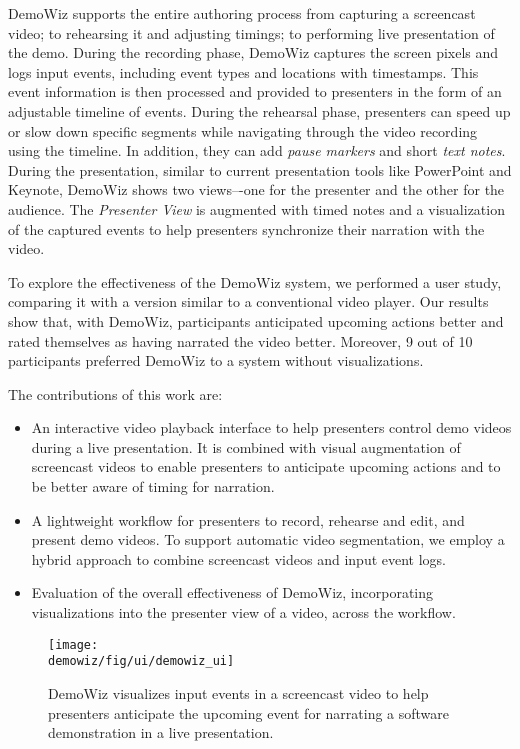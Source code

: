 DemoWiz supports the entire authoring process from capturing a screencast video; to rehearsing it and adjusting timings; to performing live presentation of the demo. During the recording phase, DemoWiz captures the screen pixels and logs input events, including event types and locations with timestamps. This event information is then processed and provided to presenters in the form of an adjustable timeline of events. During the rehearsal phase, presenters can speed up or slow down specific segments while navigating through the video recording using the timeline. In addition, they can add \textit{pause markers} and short \textit{text notes}. During the presentation, similar to current presentation tools like PowerPoint and Keynote, DemoWiz shows two views–-one for the presenter and the other for the audience. The \textit{Presenter View} is augmented with timed notes and a visualization of the captured events to help presenters synchronize their narration with the video.

To explore the effectiveness of the DemoWiz system, we performed a user study, comparing it with a version similar to a conventional video player. Our results show that, with DemoWiz, participants anticipated upcoming actions better and rated themselves as having narrated the video better. Moreover, 9 out of 10 participants preferred DemoWiz to a system without visualizations.

The contributions of this work are:

\begin{itemize}
  \item An interactive video playback interface to help presenters control demo videos during a live presentation. It is combined with visual augmentation of screencast videos to enable presenters to anticipate upcoming actions and to be better aware of timing for narration.
  \item A lightweight workflow for presenters to record, rehearse and edit, and present demo videos. To support automatic video segmentation, we employ a hybrid approach to combine screencast videos and input event logs.
  \item Evaluation of the overall effectiveness of DemoWiz, incorporating visualizations into the presenter view of a video, across the workflow.
\end{itemize}

\begin{figure*}[t]
  \centering
  \texttt{[image: \\demowiz/fig/ui/demowiz\_ui]}
  \caption{DemoWiz visualizes input events in a screencast video to help presenters anticipate the upcoming event for narrating a software demonstration in a live presentation.}
  \label{fig:demowiz_teaser}
\end{figure*}
